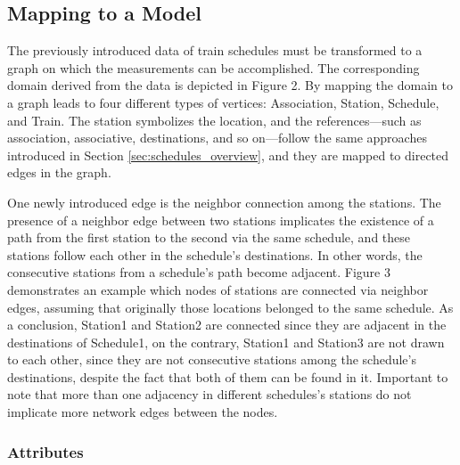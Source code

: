 \subsection{Mapping to a Model}\label{sec:mapping_schedule}

The previously introduced data of train schedules must be transformed to a graph on which the measurements can be accomplished. The corresponding domain derived from the data is depicted in Figure 2. %
By mapping the domain to a graph leads to four different types of vertices: \textsf{Association}, \textsf{Station}, \textsf{Schedule}, and \textsf{Train}. The station symbolizes the location, and the references---such as \textsf{association}, \textsf{associative}, \textsf{destinations}, and so on---follow the same approaches introduced in Section \ref{sec:schedules_overview}, and they are mapped to directed edges in the graph. 

One newly introduced edge is the \textsf{neighbor} connection among the stations. The presence of a \textsf{neighbor} edge between two stations implicates the existence of a path from the first station to the second via the same schedule, and these stations follow each other in the schedule's destinations. In other words, the consecutive stations from a schedule's path become adjacent. Figure 3 demonstrates an example which nodes of stations are connected via \textsf{neighbor} edges, assuming that originally those locations belonged to the same schedule. As a conclusion, \textsf{Station1} and \textsf{Station2} are connected since they are adjacent in the destinations of \textsf{Schedule1}, on the contrary, \textsf{Station1} and \textsf{Station3} are not drawn to each other, since they are not consecutive stations among the schedule's destinations, despite the fact that both of them can be found in it. %
Important to note that more than one adjacency in different schedules's stations do not implicate more \textsf{network} edges between the nodes.

\subsubsection{Attributes}

